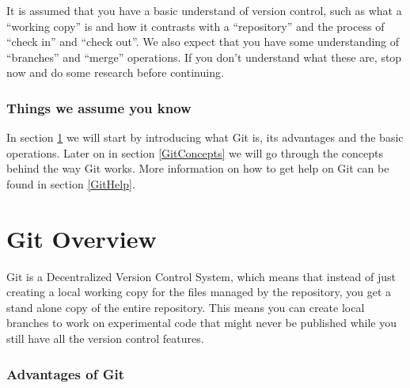 It is assumed that you have a basic understand of version control,
such as
what a ``working copy'' is and how it contrasts with a ``repository''
and the process of ``check in'' and ``check out''.
We also expect that you have some understanding of ``branches''
and ``merge'' operations. If you don't understand
what these are, stop now and do some research before continuing.

\begin{frame}[fragile]
  \label{ThingsWeAssumeYouKnow}
  \frametitle{Things we assume you know}



\end{frame}

In section \ref{GitOverview} we will start by introducing what Git is,
its advantages and the basic operations. Later on in
section \ref{GitConcepts} we will go through the concepts behind the
way Git works. More information on how to get help on Git can be found
in section \ref{GitHelp}.

\section{Git Overview}
\label{GitOverview}

Git is a Decentralized Version Control System, which means that
instead of just creating a local working copy for the files managed by
the repository, you get a stand alone copy of the entire
repository. This means you can create local branches to work on
experimental code that might never be published while you still have
all the version control features.

\begin{frame}[fragile]
  \frametitle{Advantages of Git}



\end{frame}

